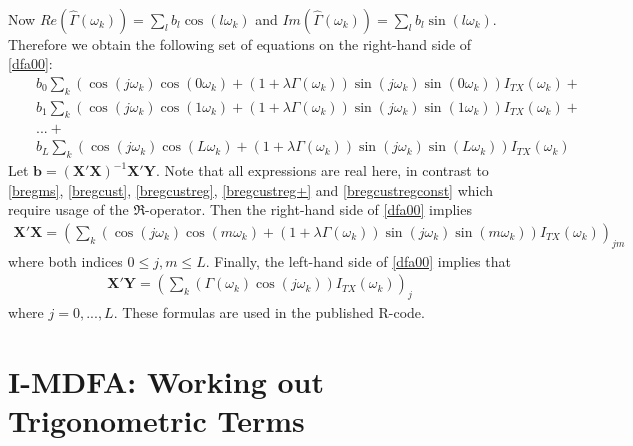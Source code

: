 \documentclass[11pt]{article}
\begin{document}
\begin{appendix}
\begin{eqnarray}
\end{eqnarray}
Now $Re(\hat{\Gamma}(\omega_k))=\sum_l b_l\cos(l\omega_k)$ and $Im(\hat{\Gamma}(\omega_k))=\sum_l b_l\sin(l\omega_k)$. Therefore we obtain the following set of equations on the right-hand side of \ref{dfa00}:
\begin{eqnarray*}
&&b_0\sum_k (\cos(j\omega_k)\cos(0\omega_k)+(1+\lambda\Gamma(\omega_k)) \sin(j\omega_k)\sin(0\omega_k))I_{TX}(\omega_k)+\\
&&b_1\sum_k (\cos(j\omega_k)\cos(1\omega_k)+(1+\lambda\Gamma(\omega_k)) \sin(j\omega_k)\sin(1\omega_k))I_{TX}(\omega_k)+\\
&&...+\\
&&b_L\sum_k (\cos(j\omega_k)\cos(L\omega_k)+(1+\lambda\Gamma(\omega_k)) \sin(j\omega_k)\sin(L\omega_k))I_{TX}(\omega_k)
\end{eqnarray*}
Let $\mathbf{b}=\left(\mathbf{X'X}\right)^{-1}\mathbf{X'Y}$. Note that all expressions are real here, in contrast to \ref{bregms}, \ref{bregcust}, \ref{bregcustreg},  \ref{bregcustreg+} and \ref{bregcustregconst} which require usage of the $\Re$-operator. Then the right-hand side of \ref{dfa00} implies
\begin{eqnarray}\label{dfa0}
\mathbf{X'X}=\left(\sum_k (\cos(j\omega_k)\cos(m\omega_k)+(1+\lambda\Gamma(\omega_k)) \sin(j\omega_k)\sin(m\omega_k))I_{TX}(\omega_k)\right)_{jm}
\end{eqnarray}
where both indices $0\leq j,m\leq L$. Finally, the left-hand side of \ref{dfa00} implies that
\begin{eqnarray}\label{dfa1}
\mathbf{X'Y}=\left(\sum_k (\Gamma(\omega_k)\cos(j\omega_k))I_{TX}(\omega_k)\right)_j
\end{eqnarray}
where $j=0,...,L$. These formulas are used in the published R-code.\\


\section{I-MDFA: Working out Trigonometric Terms}\label{aimdfa}


\end{appendix}
\end{document}
